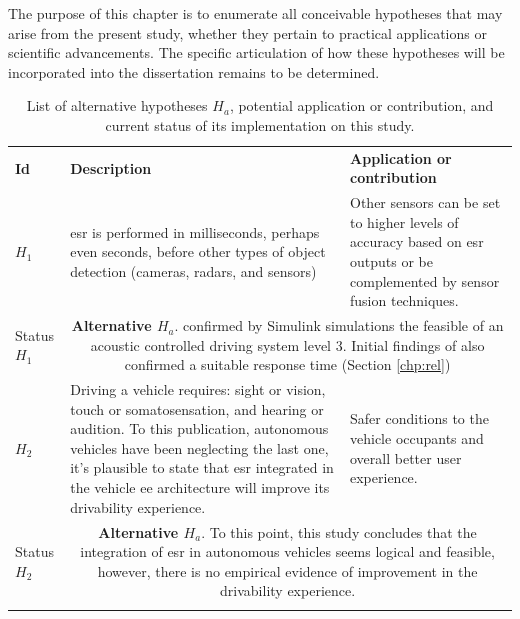 The purpose of this chapter is to enumerate all conceivable hypotheses that may arise from the present study, whether they pertain to practical applications or scientific advancements. The specific articulation of how these hypotheses will be incorporated into the dissertation remains to be determined.

\begin{table}[ht!]
    \caption[List of alternative hypotheses $H_a$ defined during the study development ]{List of alternative hypotheses $H_a$, potential application or contribution, and current status of its implementation on this study.}
    \label{table:hypotheses_list_ha}
    \centering
    \begin{tabular}{p{1.7cm}|p{6.5cm}|p{6.5cm}}
        \Xhline{2\arrayrulewidth} 
        \rowcolor{lightgray}
        \textbf{Id} & \textbf{Description} & \textbf{Application or contribution} \\
        $H_1$ & 
        \gls{esr} is performed in milliseconds, perhaps even seconds, before other types of object detection (cameras, radars, and sensors) & 
        Other sensors can be set to higher levels of accuracy based on \gls{esr} outputs or be complemented by sensor fusion techniques. \\
        \hline
        \rowcolor{gray!20} Status $H_1$ & \multicolumn{2}{c}{\parbox{13.4cm}{\textbf{Alternative $H_a$}. \textcite{Veeraraghavan2020} confirmed by  Simulink simulations the feasible of an acoustic controlled driving system level 3. Initial findings of \textcite{Yin2023} also confirmed a suitable response time (Section \ref{chp:rel}) }} \\       
        \hline \hline
        $H_2$ & 
        Driving a vehicle requires: sight or vision, touch or somatosensation, and hearing or audition. To this publication, autonomous vehicles have been neglecting the last one, it’s plausible to state that \gls{esr} integrated in the vehicle \gls{ee} architecture will improve its drivability experience. & 
        Safer conditions to the vehicle occupants and overall better user experience.\\
        \hline
        \rowcolor{gray!20} Status $H_2$ & \multicolumn{2}{c}{\parbox{13.4cm}{\textbf{Alternative $H_a$}. To this point, this study concludes that the integration of \gls{esr} in autonomous vehicles seems logical and feasible, however, there is no empirical evidence of improvement in the drivability experience.}} \\       
        \Xhline{2\arrayrulewidth}
    \end{tabular}
\end{table}


